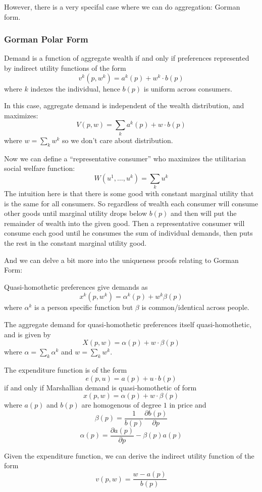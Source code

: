 However, there is a very specifal case where we can do aggregation:
Gorman form. 

\subsubsection{Gorman Polar Form}
\label{sec:gorman-polar-form}


\begin{prop}
  Demand is a function of aggregate wealth if and only if preferences
  represented by indirect utility functions of the form
  \[
  v^k(p, w^k) = a^k(p) + w^k \cdot b(p)
  \]
  where $k$ indexes the individual, hence $b(p)$ is uniform across
  consumers.
\end{prop}


In this case, aggregate demand is independent of the wealth
distribution, and maximizes:
\[
V(p,w) = \sum_k a^k(p) + w \cdot b(p)
\]
where $w = \sum_k w^k$ so we don't care about distribution. 

Now we can define a ``representative consumer'' who maximizes the
utilitarian social welfare function:
\[
W(u^1, \dots, u^k) = \sum_k u^k
\]
The intuition here is that there is some good with constant marginal
utility that is the same for all consumers. So regardless of wealth
each consumer will consume other goods until marginal utility drops
below $b(p)$ and then will put the remainder of wealth into the given
good. Then a representative consumer will consume each good until he
consumes the sum of individual demands, then puts the rest in the
constant marginal utility good.

And we can delve a bit more into the uniqueness proofs relating to
Gorman Form:

\begin{definition}
  Quasi-homothetic preferences give demands as
  \[
  x^k(p, w^k) = \alpha^k(p) + w^k \beta(p)
  \]
  where $\alpha^k$ is a person specific function but $\beta$ is
  common/identical across people.

  The aggregate demand for quasi-homothetic preferences itself
  quasi-homothetic, and is given by
  \[
  X(p,w) = \alpha(p) + w \cdot \beta(p)
  \]
  where $\alpha = \sum_k \alpha^k$ and $w = \sum_k w^k$.
\end{definition}


\begin{theorem}
  The expenditure function is of the form
  \[
  e(p,u) = a(p) + u \cdot b(p)
  \]
  if and only if Marshallian demand is quasi-homothetic of form
  \[
  x(p,w) = \alpha(p) + w \cdot \beta(p)
  \]
  where $a(p)$ and $b(p)$ are homogenous of degree $1$ in price and
  \[
  \beta(p) = \frac{1}{b(p)}\frac{\partial b(p)}{\partial p}
  \]
  \[
  \alpha(p) = \frac{\partial a(p)}{\partial p} - \beta(p)a(p)
  \]

  Given the expenditure function, we can derive the indirect utility
  function of the form
  \[
  v(p,w) = \frac{w - a(p)}{b(p)}
  \]
\end{theorem}
